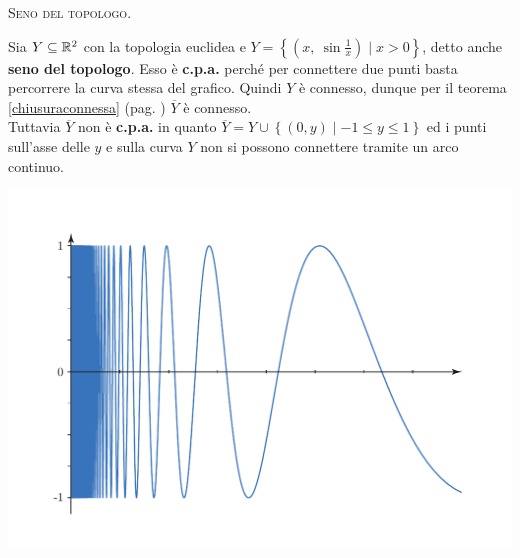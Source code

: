 \begin{example}\textsc{Seno del topologo.}\\
\begin{minipage}{0.47\textwidth}
Sia $Y\subseteq \mathbb{R}^2$ con la topologia euclidea e $Y=\left\{ \left( x,\ \sin\frac{1}{x} \right) \mid x>0 \right\}$, detto anche \textbf{seno del topologo}. Esso è \textbf{c.p.a.} perché per connettere due punti basta percorrere la curva stessa del grafico. Quindi $Y$ è connesso, dunque per il teorema \ref{chiusuraconnessa} (pag. \pageref{chiusuraconnessa}) $\overline{Y}$ è connesso.\\
Tuttavia $\overline{Y}$ non è \textbf{c.p.a.} in quanto $\overline{Y}=Y\cup \left\{ (0,y) \mid -1\leq y \leq 1 \right\}$ ed i punti sull'asse delle $y$ e sulla curva $Y$ non si possono connettere tramite un arco continuo.
\end{minipage}
\hspace{-7mm}
\begin{minipage}{0.52\textwidth}
	\includegraphics[trim=0cm 0.5cm 0.5cm 1.25cm,clip,scale=0.50]{images/topologistsine.pdf}
\end{minipage}
\end{example}
